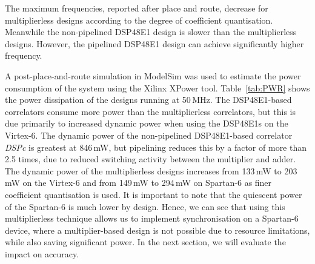 The maximum frequencies, reported after place and route, decrease for multiplierless designs according to the degree of coefficient quantisation.
Meanwhile the non-pipelined DSP48E1 design is slower than the multiplierless designs.
However, the pipelined DSP48E1 design can achieve significantly higher frequency.

A post-place-and-route simulation in ModelSim was used to estimate the power consumption of the system using the Xilinx XPower tool.
Table~\ref{tab:PWR} shows the power dissipation of the designs running at 50\,MHz.
The DSP48E1-based correlators consume more power than the multiplierless correlators, but this is due primarily to increased dynamic power when using the DSP48E1s on the Virtex-6.
The dynamic power of the non-pipelined DSP48E1-based correlator \emph{DSPc} is greatest at 846\,mW, but pipelining reduces this by a factor of more than 2.5 times, due to reduced switching activity between the multiplier and adder.
The dynamic power of the multiplierless designs increases from 133\,mW to 203\,mW on the Virtex-6 and from 149\,mW to 294\,mW on Spartan-6 as finer coefficient quantisation is used.
It is important to note that the quiescent power of the Spartan-6 is much lower by design.
Hence, we can see that using this multiplierless technique allows us to implement synchronisation on a Spartan-6 device, where a multiplier-based design is not possible due to resource limitations, while also saving significant power.
In the next section, we will evaluate the impact on accuracy.

